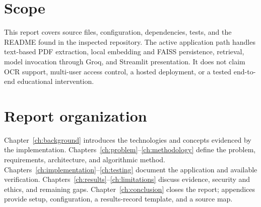 \section{Scope}
This report covers source files, configuration, dependencies, tests, and the README found in the inspected repository. The active application path handles text-based PDF extraction, local embedding and FAISS persistence, retrieval, model invocation through Groq, and Streamlit presentation. It does not claim OCR support, multi-user access control, a hosted deployment, or a tested end-to-end educational intervention.

\section{Report organization}
Chapter~\ref{ch:background} introduces the technologies and concepts evidenced by the implementation. Chapters~\ref{ch:problem}--\ref{ch:methodology} define the problem, requirements, architecture, and algorithmic method. Chapters~\ref{ch:implementation}--\ref{ch:testing} document the application and available verification. Chapters~\ref{ch:results}--\ref{ch:limitations} discuss evidence, security and ethics, and remaining gaps. Chapter~\ref{ch:conclusion} closes the report; appendices provide setup, configuration, a results-record template, and a source map.
